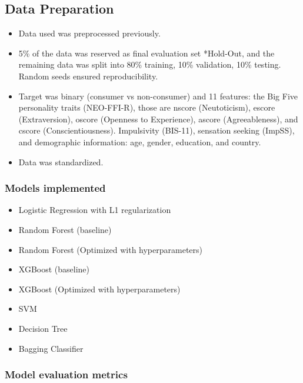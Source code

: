 \documentclass{article}
\begin{document}
\subsection*{Data Preparation}

\begin{itemize}
    \item Data used was preprocessed previously.
    \item 5\% of the data was reserved as final evaluation set *Hold-Out, and the remaining data was split into 80\% training, 10\% validation, 10\% testing. Random seeds ensured reproducibility.
    \item Target was binary (consumer vs non-consumer) and 11 features: the Big Five personality traits (NEO-FFI-R), those are nscore (Neutoticism), escore (Extraversion), oscore (Openness to Experience), ascore (Agreeableness), and cscore (Conscientiousness). Impulsivity (BIS-11), sensation seeking (ImpSS), and demographic information: age, gender, education, and country.
    \item Data was standardized.
\end{itemize}

\subsubsection*{Models implemented}

\begin{itemize}
    \item Logistic Regression with L1 regularization
    \item Random Forest (baseline)
    \item Random Forest (Optimized with hyperparameters)
    \item XGBoost (baseline)
    \item XGBoost (Optimized with hyperparameters)
    \item SVM
    \item Decision Tree
    \item Bagging Classifier
\end{itemize}


\subsubsection*{Model evaluation metrics}
\end{document}
